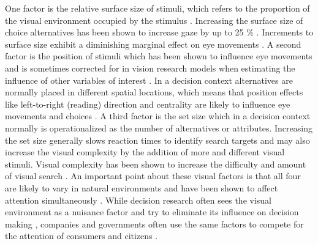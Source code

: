 \documentclass[english,natbib,man,floatsintext]{apa6}
\begin{document}
One factor is the relative surface size of stimuli, which refers to the proportion of the visual environment occupied by the stimulus \citep[for a review see][]{peschel2013a}. Increasing the surface size of choice alternatives has been shown to increase gaze by up to 25 \% \citep{chandon2009a}. Increments to surface size exhibit a diminishing marginal effect on eye movements \citep{lohse1997a}. A second factor is the position of stimuli which has been shown to influence eye movements and is sometimes corrected for in vision research models when estimating the influence of other variables of interest \citep{clarke2014a}. In a decision context alternatives are normally placed in different spatial locations, which means that position effects like left-to-right (reading) direction and centrality are likely to influence eye movements and choices \citep{atalay2012a, meissner2016a}. A third factor is the set size which in a decision context normally is operationalized as the number of alternatives or attributes. Increasing the set size generally slows reaction times to identify search targets \citep{wolfe2010} and may also increase the visual complexity by the addition of more and different visual stimuli. Visual complexity has been shown to increase the difficulty and amount of visual search \citep{rosenholtz2007a}. An important point about these visual factors is that all four are likely to vary in natural environments and have been shown to affect attention simultaneously \citep{orquin2019a}. While decision research often sees the visual environment as a nuisance factor and try to eliminate its influence on decision making \citep{brandstatter2014, gloeckner2011a, perkovic2018}, companies and governments often use the same factors to compete for the attention of consumers and citizens \citep{pieters2017, orquinwedel2020}.\\   
\end{document}
